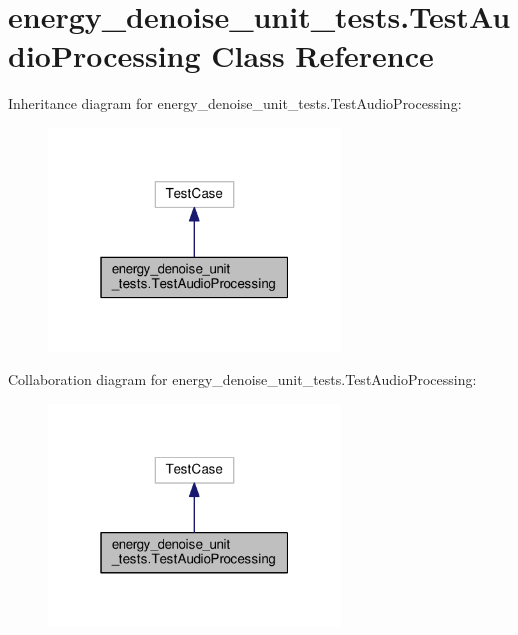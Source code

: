 \hypertarget{classenergy__denoise__unit__tests_1_1TestAudioProcessing}{\section{energy\-\_\-denoise\-\_\-unit\-\_\-tests.\-Test\-Audio\-Processing Class Reference}
\label{classenergy__denoise__unit__tests_1_1TestAudioProcessing}
}


Inheritance diagram for energy\-\_\-denoise\-\_\-unit\-\_\-tests.\-Test\-Audio\-Processing\-:
\nopagebreak
\begin{figure}[H]
\begin{center}
\leavevmode
\includegraphics[width=220pt]{classenergy__denoise__unit__tests_1_1TestAudioProcessing__inherit__graph}
\end{center}
\end{figure}


Collaboration diagram for energy\-\_\-denoise\-\_\-unit\-\_\-tests.\-Test\-Audio\-Processing\-:
\nopagebreak
\begin{figure}[H]
\begin{center}
\leavevmode
\includegraphics[width=220pt]{classenergy__denoise__unit__tests_1_1TestAudioProcessing__coll__graph}
\end{center}
\end{figure}
